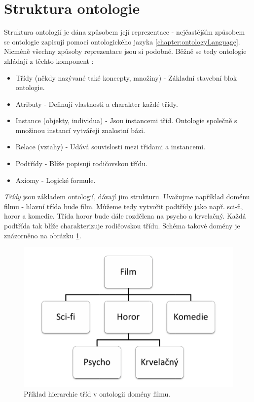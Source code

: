 \section{Struktura ontologie}

Struktura ontologií je dána způsobem její reprezentace - nejčastějším způsobem se ontologie zapisují pomocí ontologického jazyka \ref{chapter:ontologyLanguage}.
Nicméně všechny způsoby reprezentace jsou si podobné. Běžně se tedy ontologie zkládají z těchto komponent \cite{noy}:

\begin{itemize}
\item Třídy (někdy nazývané také koncepty, množiny) - Základní stavební blok ontologie.
\item Atributy - Definují vlastnosti a charakter každé třídy.
\item Instance (objekty, individua) - Jsou instancemi tříd. Ontologie společně s množinou instancí vytvářejí znalostní bázi.
\item Relace (vztahy) - Udává souvislosti mezi třidami a instancemi.
\item Podtřídy - Blíže popisují rodičovskou třídu.
\item Axiomy - Logické formule.
\end{itemize}

\textit{Třídy} jsou základem ontologií, dávají jim strukturu. Uvažujme například doménu filmu - hlavní třída bude film. Můžeme tedy vytvořit podtřídy jako např. sci-fi, horor a komedie. Třída horor bude dále rozdělena na psycho a krvelačný. Každá podtřída tak blíže charakterizuje rodičovskou třídu. Schéma takové domény je znázorněno na obrázku \ref{img:movieClasses}.

\begin{figure}[h]
\begin{center}
\includegraphics{figures/movieClasses}
\caption{Příklad hierarchie tříd v ontologii domény filmu.}
\label{img:movieClasses}
\end{center}
\end{figure}

